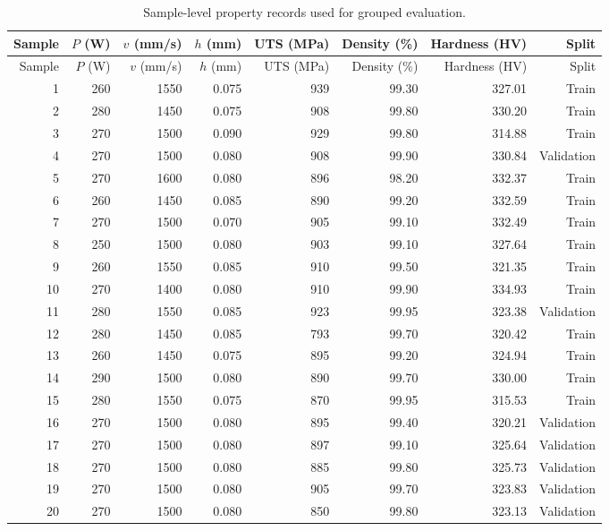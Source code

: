 \documentclass[12pt,a4paper,oneside]{report}
\begin{document}
\begin{longtable}{rrrrrrrr}
\caption{Sample-level property records used for grouped evaluation.}\label{tab:raw-summary}\\
\toprule
Sample & $P$ (W) & $v$ (mm/s) & $h$ (mm) & UTS (MPa) & Density (\%) & Hardness (HV) & Split\\
\midrule
\endfirsthead
\toprule
Sample & $P$ (W) & $v$ (mm/s) & $h$ (mm) & UTS (MPa) & Density (\%) & Hardness (HV) & Split\\
\midrule
\endhead
1 & 260 & 1550 & 0.075 & 939 & 99.30 & 327.01 & Train\\
2 & 280 & 1450 & 0.075 & 908 & 99.80 & 330.20 & Train\\
3 & 270 & 1500 & 0.090 & 929 & 99.80 & 314.88 & Train\\
4 & 270 & 1500 & 0.080 & 908 & 99.90 & 330.84 & Validation\\
5 & 270 & 1600 & 0.080 & 896 & 98.20 & 332.37 & Train\\
6 & 260 & 1450 & 0.085 & 890 & 99.20 & 332.59 & Train\\
7 & 270 & 1500 & 0.070 & 905 & 99.10 & 332.49 & Train\\
8 & 250 & 1500 & 0.080 & 903 & 99.10 & 327.64 & Train\\
9 & 260 & 1550 & 0.085 & 910 & 99.50 & 321.35 & Train\\
10 & 270 & 1400 & 0.080 & 910 & 99.90 & 334.93 & Train\\
11 & 280 & 1550 & 0.085 & 923 & 99.95 & 323.38 & Validation\\
12 & 280 & 1450 & 0.085 & 793 & 99.70 & 320.42 & Train\\
13 & 260 & 1450 & 0.075 & 895 & 99.20 & 324.94 & Train\\
14 & 290 & 1500 & 0.080 & 890 & 99.70 & 330.00 & Train\\
15 & 280 & 1550 & 0.075 & 870 & 99.95 & 315.53 & Train\\
16 & 270 & 1500 & 0.080 & 895 & 99.40 & 320.21 & Validation\\
17 & 270 & 1500 & 0.080 & 897 & 99.10 & 325.64 & Validation\\
18 & 270 & 1500 & 0.080 & 885 & 99.80 & 325.73 & Validation\\
19 & 270 & 1500 & 0.080 & 905 & 99.70 & 323.83 & Validation\\
20 & 270 & 1500 & 0.080 & 850 & 99.80 & 323.13 & Validation\\
\bottomrule
\end{longtable}
\end{document}

